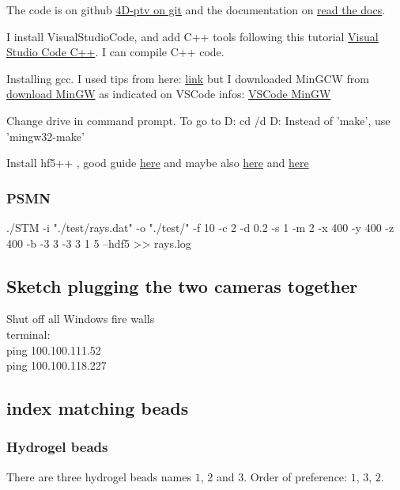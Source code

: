 \documentclass[lineno]{jfm}
\begin{document}
The code is on github \href{https://github.com/turbulencelyon/4d-ptv} {4D-ptv on git} and the documentation on \href{https://4d-ptv.readthedocs.io/en/latest/} {read the docs}. 


I install VisualStudioCode, and add C++ tools following this tutorial \href{https://code.visualstudio.com/docs/languages/cpp} {Visual Studio Code C++}. I can compile C++ code.

Installing gcc. I used tips from here: \href{https://www.cs.odu.edu/~zeil/cs250PreTest/latest/Public/installingACompiler/}{link} but I downloaded MinGCW from \href{https://sourceforge.net/projects/mingw-w64/files/Toolchains\%20targetting\%20Win32/Personal\%20Builds/mingw-builds/installer/mingw-w64-install.exe/download}{download MinGW} as indicated on VSCode infos: \href{https://code.visualstudio.com/docs/cpp/config-mingw}{VSCode MinGW}

Change drive in command prompt. To go to D: cd /d D:
Instead of 'make', use 'mingw32-make'

Install hf5++ , good guide \href{https://accserv.lepp.cornell.edu/svn/packages/hdf5/release_docs/INSTALL}{here} and maybe also \href{http://hdf-forum.184993.n3.nabble.com/Trouble-compiling-with-h5c-td4027367.html}{here} and \href{https://stackoverflow.com/questions/60271865/compiling-hdf5-source-with-g}{here}

\subsubsection{PSMN}

./STM -i "./test/rays.dat" -o "./test/" -f 10 -c 2 -d 0.2 -s 1 -m 2 -x 400 -y 400 -z 400 -b -3 3 -3 3 1 5 --hdf5 >> rays.log


\subsection{Sketch plugging the two cameras together}

Shut off all Windows fire walls\\
terminal:\\
ping 100.100.111.52\\
ping 100.100.118.227\\

\subsection{index matching beads}
\subsubsection{Hydrogel beads}
There are three hydrogel beads names $1$, $2$ and $3$.
Order of preference: $1$, $3$, $2$.
\end{document}
